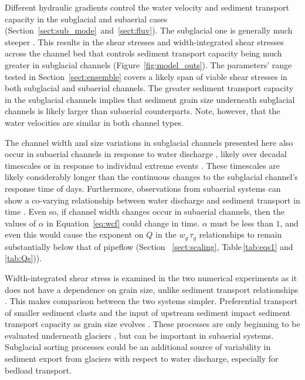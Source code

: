 \documentclass[tc, manuscript]{copernicus}
\begin{document}
Different hydraulic gradients control the water velocity and sediment transport capacity in the subglacial and subaerial cases (Section~\ref{sect:sub_mode}~and~\ref{sect:fluv}). 
The subglacial one is generally much steeper \citep{alley1997}.
This results in the shear stresses and width-integrated shear stresses across the channel bed that controls sediment transport capacity being much greater in subglacial channels (Figure~\ref{fig:model_outs}).
The parameters' range tested in Section~\ref{sect:ensemble} covers a likely span of viable shear stresses in both subglacial and subaerial channels.
The greater sediment transport capacity in the subglacial channels implies that sediment grain size underneath subglacial channels is likely larger than subaerial counterparts.
Note, however, that the water velocities are similar in both channel types.

The channel width and size variations in subglacial channels presented here also occur in subaerial channels in response to water discharge \citep{phillips2016}, likely over decadal timescales or in response to individual extreme events \citep[e.g.][]{slater2013,dean2013}.
These timescales are likely considerably longer than the continuous changes to the subglacial channel's response time of days.
Furthermore, observations from subaerial systems can show a co-varying relationship between water discharge and sediment transport in time \citep[e.g.][]{schmidt2006,pitlick2021}.
Even so, if channel width changes occur in subaerial channels, then the values of $\alpha$ in Equation~\ref{eq:wcf} could change in time.
$\alpha$ must be less than $1$, and even this would cause the exponent on $Q$ in the  $w_g\,\tau_{g}$ relationships to remain substantially below that of pipeflow (Section ~\ref{sect:scaling}, Table\,\ref{tab:eqs1} and \ref{tab:Qs})).

Width-integrated shear stress is examined in the two numerical experiments as it does not have a dependence on grain size, unlike sediment transport relationships \citep[e.g. ][Section \ref{sect:scaling}]{meyer1948}.
This makes comparison between the two systems simpler. 
Preferential transport of smaller sediment clasts and the input of upstream sediment impact sediment transport capacity as grain size evolves \citep[e.g.][]{gomez1983}.
These processes are only beginning to be evaluated underneath glaciers \citep{aitken2024}, but can be important in subaerial systems.
Subglacial sorting processes could be an additional source of variability in sediment export from glaciers with respect to water discharge, especially for bedload transport.
\end{document}
